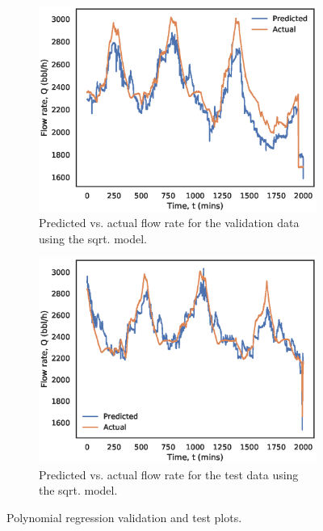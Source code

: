 \begin{figure}[h]
     \begin{subfigure}[b]{0.45\textwidth}
         \centering
         \includegraphics[width=\textwidth]{images/suncor/08sqrt_validation.eps}
         \caption{Predicted vs. actual flow rate for the validation data using the sqrt. model.}
         \label{fig:02sqrt_validation}
     \end{subfigure}
     \begin{subfigure}[b]{0.45\textwidth}
         \centering
         \includegraphics[width=\textwidth]{images/suncor/08sqrt_test.eps}
         \caption{Predicted vs. actual flow rate for the test data using the sqrt. model.}
         \label{fig:02sqrt_test}
     \end{subfigure}
        \caption{Polynomial regression validation and test plots.}
        \label{fig:02PolynomialPlots}
\end{figure}

